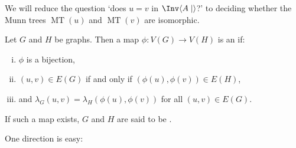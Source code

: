 \documentclass[noindex,noinsetproof,emphthm,12pt]{lmaths}
\DeclareMathOperator{\MT}{MT}
\begin{document}
	\begin{center}
	\end{center}

We will reduce the question `does $u = v$ in $\Inv \langle A \mid\rangle$?' to deciding whether the Munn trees $\MT(u)$ and $\MT(v)$ are isomorphic.

\begin{defn} \label{def:graph-isomorphism}
	Let $G$ and $H$ be graphs. Then a map $\phi : V(G) \to V(H)$ is an  if:
	\begin{enumerate}[(i)]
		\item $\phi$ is a bijection,
		\item $(u, v) \in E(G)$ if and only if $(\phi(u), \phi(v)) \in E(H)$,
		\item and $\lambda_G(u, v) = \lambda_H(\phi(u), \phi(v))$ for all $(u, v) \in E(G)$.
	\end{enumerate}
	If such a map exists, $G$ and $H$ are said to be .
\end{defn}

One direction is easy:
\end{document}

